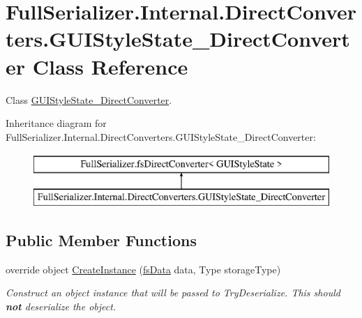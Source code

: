 \hypertarget{class_full_serializer_1_1_internal_1_1_direct_converters_1_1_g_u_i_style_state___direct_converter}{}\section{Full\+Serializer.\+Internal.\+Direct\+Converters.\+G\+U\+I\+Style\+State\+\_\+\+Direct\+Converter Class Reference}
\label{class_full_serializer_1_1_internal_1_1_direct_converters_1_1_g_u_i_style_state___direct_converter}


Class \hyperlink{class_full_serializer_1_1_internal_1_1_direct_converters_1_1_g_u_i_style_state___direct_converter}{G\+U\+I\+Style\+State\+\_\+\+Direct\+Converter}.  


Inheritance diagram for Full\+Serializer.\+Internal.\+Direct\+Converters.\+G\+U\+I\+Style\+State\+\_\+\+Direct\+Converter\+:\begin{figure}[H]
\begin{center}
\leavevmode
\includegraphics[height=2.000000cm]{class_full_serializer_1_1_internal_1_1_direct_converters_1_1_g_u_i_style_state___direct_converter}
\end{center}
\end{figure}
\subsection*{Public Member Functions}
\begin{DoxyCompactItemize}
\item 
override object \hyperlink{class_full_serializer_1_1_internal_1_1_direct_converters_1_1_g_u_i_style_state___direct_converter_a11870a07fd7aade8717b1764137d9dbb}{Create\+Instance} (\hyperlink{class_full_serializer_1_1fs_data}{fs\+Data} data, Type storage\+Type)
\begin{DoxyCompactList}\small\item\em Construct an object instance that will be passed to Try\+Deserialize. This should {\bfseries not} deserialize the object. \end{DoxyCompactList}\end{DoxyCompactItemize}
